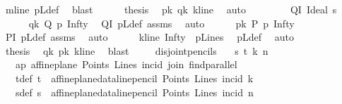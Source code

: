 \begin{isabellebody}
\ m{\isacharunderscore}{\kern0pt}line\ pLdef\ \isamarkupfalse%
\ blast\isanewline
\ \ \ \ \isamarkupfalse%
\ {\isacharquery}{\kern0pt}thesis\ \isamarkupfalse%
\ pk\ qk\ k{\isacharunderscore}{\kern0pt}line\ \isamarkupfalse%
\ auto\isanewline
\ \ \isamarkupfalse%
\isanewline
\ \ \ \ \isamarkupfalse%
\ QI{\isacharcolon}{\kern0pt}\ {\isacharparenleft}{\kern0pt}Ideal\ s{\isacharparenright}{\kern0pt}\isanewline
\ \ \ \ \isamarkupfalse%
\ qk{\isacharcolon}{\kern0pt}\ {\isachardoublequoteopen}Q\ p{\isasymlhd}\ Infty{\isachardoublequoteclose}\ \isamarkupfalse%
\ QI\ pLdef\ assms\ \isamarkupfalse%
\ auto\isanewline
\ \ \ \ \isamarkupfalse%
\ pk{\isacharcolon}{\kern0pt}\ {\isachardoublequoteopen}P\ p{\isasymlhd}\ Infty{\isachardoublequoteclose}\ \isamarkupfalse%
\ PI\ pLdef\ assms\ \isamarkupfalse%
\ auto\isanewline
\ \ \ \ \isamarkupfalse%
\ kline{\isacharcolon}{\kern0pt}\ {\isachardoublequoteopen}Infty\ {\isasymin}\ pLines{\isachardoublequoteclose}\ \isamarkupfalse%
\ pLdef\ \isamarkupfalse%
\ auto\isanewline
\ \ \ \ \isamarkupfalse%
\ \isamarkupfalse%
\ {\isacharquery}{\kern0pt}thesis\ \isamarkupfalse%
\ qk\ pk\ kline\ \isamarkupfalse%
\ blast\ \isanewline
\ \ \isamarkupfalse%
\isanewline
{}\isamarkupfalse%
%
\endisatagproof
{\isafoldproof}%
%
\isadelimproof
\isanewline
%
\endisadelimproof
\isanewline
{}\isamarkupfalse%
\ disjoint{\isacharunderscore}{\kern0pt}pencils{\isacharcolon}{\kern0pt}\isanewline
\ \ \ s\ t\ k\ n\isanewline
\ \ \ ap{\isacharcolon}{\kern0pt}\ {\isachardoublequoteopen}affine{\isacharunderscore}{\kern0pt}plane\ Points\ Lines\ incid\ join\ find{\isacharunderscore}{\kern0pt}parallel{\isachardoublequoteclose}\isanewline
\ \ \ tdef{\isacharcolon}{\kern0pt}\ {\isachardoublequoteopen}t\ {\isacharequal}{\kern0pt}\ affine{\isacharunderscore}{\kern0pt}plane{\isacharunderscore}{\kern0pt}data{\isachardot}{\kern0pt}line{\isacharunderscore}{\kern0pt}pencil\ Points\ Lines\ {\isacharparenleft}{\kern0pt}incid{\isacharparenright}{\kern0pt}\ k{\isachardoublequoteclose}\isanewline
\ \ \ sdef{\isacharcolon}{\kern0pt}\ {\isachardoublequoteopen}s\ {\isacharequal}{\kern0pt}\ affine{\isacharunderscore}{\kern0pt}plane{\isacharunderscore}{\kern0pt}data{\isachardot}{\kern0pt}line{\isacharunderscore}{\kern0pt}pencil\ Points\ Lines\ {\isacharparenleft}{\kern0pt}incid{\isacharparenright}{\kern0pt}\ n{\isachardoublequoteclose}\isanewline

\end{isabellebody}
